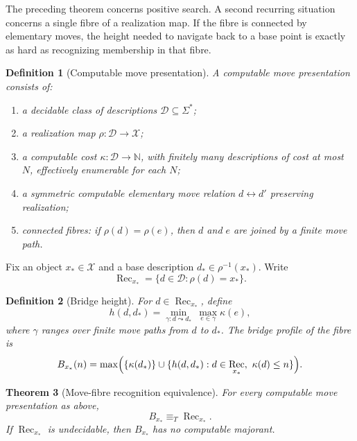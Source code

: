 \documentclass[11pt]{article}
\newtheorem{theorem}{Theorem}[section]
\newtheorem{definition}[theorem]{Definition}
\DeclareMathOperator{\Rec}{Rec}
\begin{document}
The preceding theorem concerns positive search. A second recurring situation concerns a single fibre of a realization map. If the fibre is connected by elementary moves, the height needed to navigate back to a base point is exactly as hard as recognizing membership in that fibre.

\begin{definition}[Computable move presentation]
A computable move presentation consists of:
\begin{enumerate}[label=(\roman*)]
\item a decidable class of descriptions \(\mathcal D\subseteq\Sigma^\ast\);
\item a realization map \(\rho:\mathcal D\to\mathcal X\);
\item a computable cost \(\kappa:\mathcal D\to\mathbb N\), with finitely many descriptions of cost at most \(N\), effectively enumerable for each \(N\);
\item a symmetric computable elementary move relation \(d\leftrightarrow d'\) preserving realization;
\item connected fibres: if \(\rho(d)=\rho(e)\), then \(d\) and \(e\) are joined by a finite move path.
\end{enumerate}
\end{definition}

Fix an object \(x_\ast\in\mathcal X\) and a base description \(d_\ast\in\rho^{-1}(x_\ast)\). Write
\[
\Rec_{x_\ast}=\{d\in\mathcal D:\rho(d)=x_\ast\}.
\]

\begin{definition}[Bridge height]
For \(d\in\Rec_{x_\ast}\), define
\[
h(d,d_\ast)=
\min_{\gamma:d\leadsto d_\ast}\ \max_{e\in\gamma}\kappa(e),
\]
where \(\gamma\) ranges over finite move paths from \(d\) to \(d_\ast\). The bridge profile of the fibre is
\[
B_{x_\ast}(n)=
\max\Bigl(\{\kappa(d_\ast)\}\cup
\{h(d,d_\ast):d\in\Rec_{x_\ast},\ \kappa(d)\leq n\}\Bigr).
\]
\end{definition}

\begin{theorem}[Move-fibre recognition equivalence]
For every computable move presentation as above,
\[
B_{x_\ast}\equiv_T \Rec_{x_\ast}.
\]
If \(\Rec_{x_\ast}\) is undecidable, then \(B_{x_\ast}\) has no computable majorant.
\end{theorem}
\end{document}
